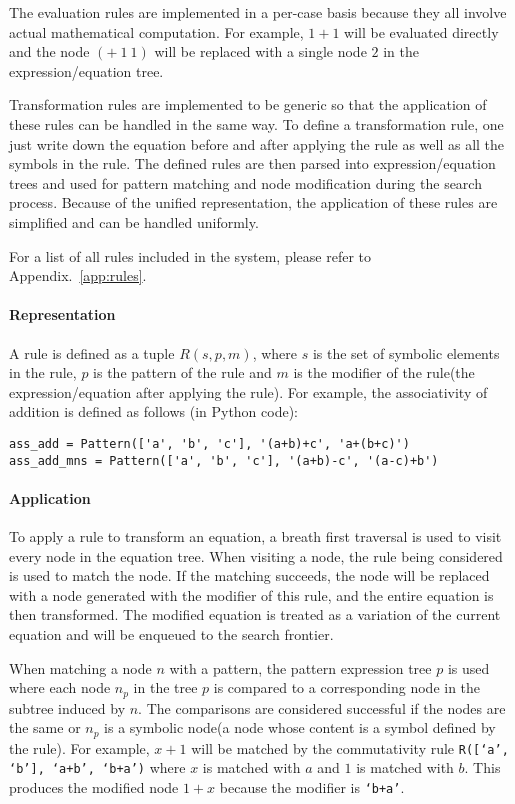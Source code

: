 \documentclass{article}
\begin{document}
The evaluation rules are implemented in a per-case basis because they all involve actual mathematical computation. For example, $1+1$ will be evaluated directly and the node $(+~1~1)$ will be replaced with a single node $2$ in the expression/equation tree.

Transformation rules are implemented to be generic so that the application of these rules can be handled in the same way. To define a transformation rule, one just write down the equation before and after applying the rule as well as all the symbols in the rule. The defined rules are then parsed into expression/equation trees and used for pattern matching and node modification during the search process. Because of the unified representation, the application of these rules are simplified and can be handled uniformly.

For a list of all rules included in the system, please refer to Appendix.~\ref{app:rules}.

\paragraph{Representation}A rule is defined as a tuple $R(s, p, m)$, where $s$ is the set of symbolic elements in the rule, $p$ is the pattern of the rule and $m$ is the modifier of the rule(the expression/equation after applying the rule). For example, the associativity of addition is defined as follows (in Python code):
\begin{lstlisting}
ass_add = Pattern(['a', 'b', 'c'], '(a+b)+c', 'a+(b+c)')
ass_add_mns = Pattern(['a', 'b', 'c'], '(a+b)-c', '(a-c)+b')
\end{lstlisting}

\paragraph{Application} To apply a rule to transform an equation, a breath first traversal is used to visit every node in the equation tree. When visiting a node, the rule being considered is used to match the node. If the matching succeeds, the node will be replaced with a node generated with the modifier of this rule, and the entire equation is then transformed. The modified equation is treated as a variation of the current equation and will be enqueued to the search frontier.

When matching a node $n$ with a pattern, the pattern expression tree $p$ is used where each node $n_p$ in the tree $p$ is compared to a corresponding node in the subtree induced by $n$. The comparisons are considered successful if the nodes are the same or $n_p$ is a symbolic node(a node whose content is a symbol defined by the rule). For example, $x+1$ will be matched by the commutativity rule \texttt{R([`a', `b'], `a+b', `b+a')} where $x$ is matched with $a$ and $1$ is matched with $b$. This produces the modified node $1+x$ because the modifier is \texttt{`b+a'}.
\end{document}
